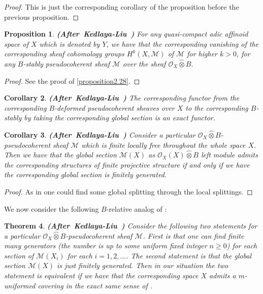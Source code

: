 \documentclass[12pt]{amsart}
\newtheorem{theorem}{Theorem}[section]
\newtheorem{proposition}[theorem]{Proposition}
\newtheorem{corollary}[theorem]{Corollary}
\theoremstyle{definition}
\numberwithin{equation}{section}
\begin{document}
\begin{proof}
This is just the corresponding corollary of the proposition before the previous proposition.	
\end{proof}


\begin{proposition}  \mbox{\bf{(After Kedlaya-Liu \cite[Theorem 2.6.5]{KL2})}}
For any quasi-compact adic affinoid space of $X$ which is denoted by $Y$, we have that the corresponding vanishing of the corresponding sheaf cohomology groups $H^k(X,\mathcal{M})$ of $\mathcal{M}$ for higher $k>0$, for any $B$-stably pseudocoherent sheaf $\mathcal{M}$ over the sheaf $\mathcal{O}_X\widehat{\otimes}B$.	
\end{proposition}


\begin{proof}
See the proof of \cref{proposition2.28}.
\end{proof}



\begin{corollary}  \mbox{\bf{(After Kedlaya-Liu \cite[Corollary 2.6.6]{KL2})}}
The corresponding functor from the corresponding $B$-deformed pseudocoherent sheaves over $X$ to the corresponding $B$-stably by taking the corresponding global section is an exact functor.
\end{corollary}


\begin{corollary}  \mbox{\bf{(After Kedlaya-Liu \cite[Corollary 2.6.8]{KL2})}}
Consider a particular $\mathcal{O}_X\widehat{\otimes}B$-pseudocoherent sheaf $\mathcal{M}$ which is finite locally free throughout the whole space $X$. Then we have that the global section $\mathcal{M}(X)$ as $\mathcal{O}_X(X)\widehat{\otimes}B$ left module admits the corresponding structures of finite projective structure if and only if we have the corresponding global section is finitely generated.
\end{corollary}

\begin{proof}
As in \cite[Corollary 2.6.8]{KL2} one could find some global splitting through the local splittings.
\end{proof}

\indent We now consider the following $B$-relative analog of \cite[Proposition 2.6.17]{KL2}:

\begin{theorem} \mbox{\bf{(After Kedlaya-Liu \cite[Proposition 2.6.17]{KL2})}} \label{theorem4.31}
Consider the following two statements for a particular $\mathcal{O}_X\widehat{\otimes}B$-pseudocoherent sheaf $\mathcal{M}$. First is that one can find finite many generators (the number is up to some uniform fixed integer $n\geq 0$) for each section of $\mathcal{M}(X_i)$ for each $i=1,2,...$. The second statement is that the global section $\mathcal{M}(X)$ is just finitely generated. Then in our situation the two statement is equivalent if we have that the corresponding space $X$ admits a $m$-uniformed covering in the exact same sense of \cite[Proposition 2.6.17]{KL2}. 	
\end{theorem}
\end{document}
